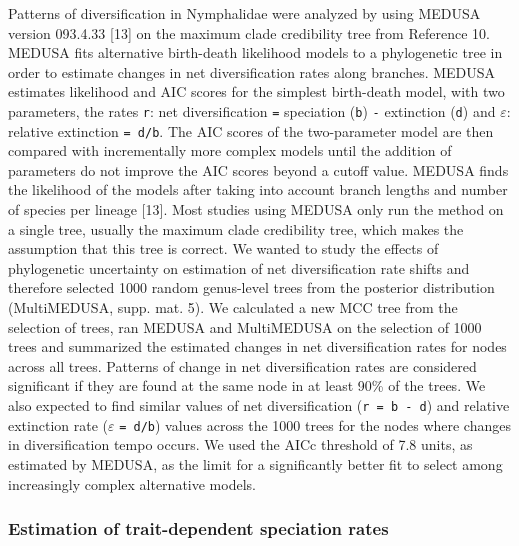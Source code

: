 \documentclass[10pt]{article}
\begin{document}
Patterns of diversification in Nymphalidae were analyzed by using MEDUSA
version 093.4.33 {[}13{]} on the maximum clade credibility tree from
Reference 10. MEDUSA fits alternative birth-death likelihood models to a
phylogenetic tree in order to estimate changes in net diversification
rates along branches. MEDUSA estimates likelihood and AIC scores for the
simplest birth-death model, with two parameters, the rates \texttt{r}:
net diversification \texttt{=} speciation (\texttt{b}) \texttt{-}
extinction (\texttt{d}) and $\varepsilon$: relative extinction
\texttt{= d/b}. The AIC scores of the two-parameter model are then
compared with incrementally more complex models until the addition of
parameters do not improve the AIC scores beyond a cutoff value. MEDUSA
finds the likelihood of the models after taking into account branch
lengths and number of species per lineage {[}13{]}. Most studies using
MEDUSA only run the method on a single tree, usually the maximum clade
credibility tree, which makes the assumption that this tree is correct.
We wanted to study the effects of phylogenetic uncertainty on estimation
of net diversification rate shifts and therefore selected 1000 random
genus-level trees from the posterior distribution (MultiMEDUSA, supp.
mat. 5). We calculated a new MCC tree from the selection of trees, ran
MEDUSA and MultiMEDUSA on the selection of 1000 trees and summarized the
estimated changes in net diversification rates for nodes across all
trees. Patterns of change in net diversification rates are considered
significant if they are found at the same node in at least 90\% of the
trees. We also expected to find similar values of net diversification
(\texttt{r = b - d}) and relative extinction rate ($\varepsilon$
\texttt{= d/b}) values across the 1000 trees for the nodes where changes
in diversification tempo occurs. We used the AICc threshold of 7.8
units, as estimated by MEDUSA, as the limit for a significantly better
fit to select among increasingly complex alternative models.

\subsubsection{Estimation of trait-dependent speciation
rates}\label{estimation-of-trait-dependent-speciation-rates}
\end{document}
